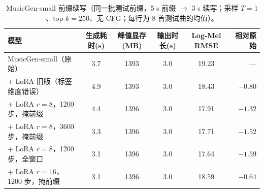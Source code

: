 \begin{table}[H]
\centering\small
\caption{MusicGen-small 前缀续写（同一批测试前缀，5 s 前缀 $\to$ 3 s 续写；采样 $T=1$、top-$k=250$、无 CFG；每行为 8 首测试曲的均值）。}
\label{tab:generation}
\begin{tabular}{lccccr}
\toprule
模型 & 生成耗时(s) & 峰值显存(MB) & 输出时长(s) & Log-Mel RMSE & 相对原始\\
\midrule
MusicGen-small（原始） & 3.7 & 1393 & 3.0 & 19.23 & —\\
\quad + LoRA 旧版（标签维度错误） & 4.9 & 1393 & 3.0 & 18.43 & $-0.80$\\
\quad + LoRA $r{=}8$，1200 步，掩前缀 & 4.4 & 1396 & 3.0 & 17.91 & $-1.32$\\
\quad + LoRA $r{=}8$，3600 步，掩前缀 & 3.3 & 1396 & 3.0 & 17.71 & $-1.52$\\
\quad + LoRA $r{=}8$，1200 步，全窗口 & 3.1 & 1396 & 3.0 & 17.64 & $-1.59$\\
\quad + LoRA $r{=}16$，1200 步，掩前缀 & 3.1 & 1396 & 3.0 & 18.59 & $-0.64$\\
\bottomrule
\end{tabular}
\end{table}
